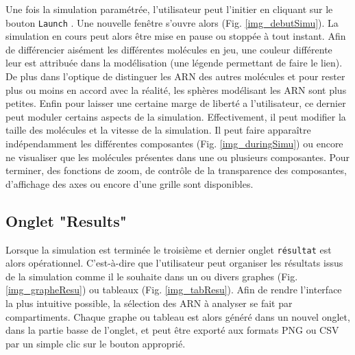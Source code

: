 
Une fois la simulation paramétrée, l'utilisateur peut l'initier en
cliquant sur le bouton \og{} \texttt{Launch} \fg{}. Une nouvelle
fenêtre s'ouvre alors (Fig. \ref{img_debutSimu}). La simulation en
cours peut alors être mise en pause ou stoppée à tout instant. Afin de
différencier aisément les différentes molécules en jeu, une couleur
différente leur est attribuée dans la modélisation (une légende
permettant de faire le lien). De plus dans l'optique de distinguer les
ARN des autres molécules et pour rester plus ou moins en accord avec
la réalité, les sphères modélisant les ARN sont plus petites. Enfin
pour laisser une certaine marge de liberté a l'utilisateur, ce dernier
peut moduler certains aspects de la simulation. Effectivement, il peut
modifier la taille des molécules et la vitesse de la simulation. Il
peut faire apparaître indépendamment les différentes composantes (Fig.
\ref{img_duringSimu}) ou encore ne visualiser que les molécules
présentes dans une ou plusieurs composantes. Pour terminer, des
fonctions de zoom, de contrôle de la transparence des composantes,
d'affichage des axes ou encore d'une grille sont disponibles.


\subsection{Onglet "Results"}

Lorsque la simulation est terminée le troisième et dernier onglet
\texttt{résultat} est alors opérationnel. C'est-à-dire que
l'utilisateur peut organiser les résultats issus de la simulation
comme il le souhaite dans un ou divers graphes
(Fig. \ref{img_grapheResu}) ou tableaux (Fig. \ref{img_tabResu}). Afin
de rendre l'interface la plus intuitive possible, la sélection des ARN
à analyser se fait par compartiments. Chaque graphe ou tableau est
alors généré dans un nouvel onglet, dans la partie basse de l'onglet,
et peut être exporté aux formats PNG ou CSV par un simple clic sur le
bouton approprié.



